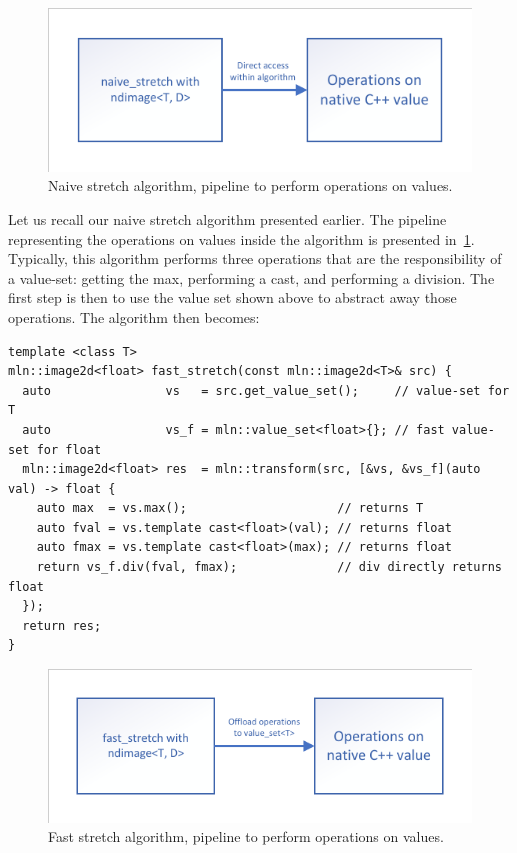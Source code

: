 \begin{figure}[htbp]
  \centering
  \includegraphics[width=.8\linewidth]{figs/static_dynamic_bridge/naive_stretch}
  \caption{Naive stretch algorithm, pipeline to perform operations on values.}
  \label{fig:static_dyn.naive_stretch}
\end{figure}

Let us recall our naive stretch algorithm presented earlier. The pipeline representing the operations on values inside
the algorithm is presented in~\cref{fig:static_dyn.naive_stretch}. Typically, this algorithm performs three operations
that are the responsibility of a value-set: getting the max, performing a cast, and performing a division. The first
step is then to use the value set shown above to abstract away those operations. The algorithm then becomes:
\begin{verbatim}
template <class T>
mln::image2d<float> fast_stretch(const mln::image2d<T>& src) {
  auto                vs   = src.get_value_set();     // value-set for T
  auto                vs_f = mln::value_set<float>{}; // fast value-set for float
  mln::image2d<float> res  = mln::transform(src, [&vs, &vs_f](auto val) -> float {
    auto max  = vs.max();                     // returns T
    auto fval = vs.template cast<float>(val); // returns float
    auto fmax = vs.template cast<float>(max); // returns float
    return vs_f.div(fval, fmax);              // div directly returns float
  });
  return res;
}
\end{verbatim}

\begin{figure}[htbp]
  \centering
  \includegraphics[width=.8\linewidth]{figs/static_dynamic_bridge/fast_stretch}
  \caption{Fast stretch algorithm, pipeline to perform operations on values.}
  \label{fig:static_dyn.fast_stretch}
\end{figure}

